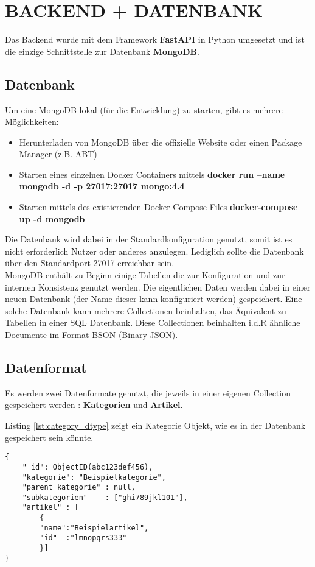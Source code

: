 \section{BACKEND + DATENBANK}\label{ch:backend}

Das Backend wurde mit dem Framework \textbf{FastAPI} in Python umgesetzt und ist die einzige Schnittstelle zur Datenbank \textbf{MongoDB}.

\subsection{Datenbank}
Um eine MongoDB lokal (für die Entwicklung) zu starten, gibt es mehrere Möglichkeiten:
\begin{itemize}
\item Herunterladen von MongoDB über die offizielle Website oder einen Package Manager (z.B. ABT)
\item Starten eines einzelnen Docker Containers mittels  \textbf{docker run --name mongodb -d -p 27017:27017 mongo:4.4}
\item Starten mittels des existierenden Docker Compose Files \textbf{docker-compose up -d mongodb}
\end{itemize}
Die Datenbank wird dabei in der Standardkonfiguration genutzt, somit ist es nicht erforderlich Nutzer oder anderes anzulegen.
Lediglich sollte die Datenbank über den Standardport 27017 erreichbar sein. \\

MongoDB enthält zu Beginn einige Tabellen die zur Konfiguration und zur internen Konsistenz genutzt werden.
Die eigentlichen Daten werden dabei in einer neuen Datenbank (der Name dieser kann konfiguriert werden) gespeichert.
Eine solche Datenbank kann mehrere Collectionen beinhalten, das Äquivalent zu Tabellen in einer SQL Datenbank.
Diese Collectionen beinhalten i.d.R ähnliche Documente im Format BSON (Binary JSON). 

\subsection{Datenformat}
Es werden zwei Datenformate genutzt, die jeweils in einer eigenen Collection gespeichert werden : \textbf{Kategorien} und \textbf{Artikel}.

Listing \ref{lst:category_dtype} zeigt ein Kategorie Objekt, wie es in der Datenbank gespeichert sein könnte.
\begin{lstlisting}[caption={Kategorie Objekt},captionpos=b,showstringspaces=false, basicstyle=\small,label={lst:category_dtype}]
{
    "_id": ObjectID(abc123def456),
    "kategorie": "Beispielkategorie",
    "parent_kategorie" : null,
    "subkategorien"    : ["ghi789jkl101"],
    "artikel" : [
        {
        "name":"Beispielartikel",
        "id"  :"lmnopqrs333"
        }]
}
\end{lstlisting}

